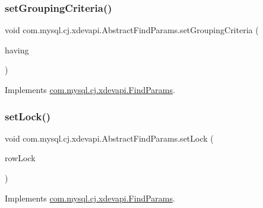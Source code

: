 \mbox{\label{classcom_1_1mysql_1_1cj_1_1xdevapi_1_1_abstract_find_params_a8e7b9f8acb811c6da58817a5d09e0444}} 
\subsubsection{\texorpdfstring{set\+Grouping\+Criteria()}{setGroupingCriteria()}}
{\footnotesize\ttfamily void com.\+mysql.\+cj.\+xdevapi.\+Abstract\+Find\+Params.\+set\+Grouping\+Criteria (\begin{DoxyParamCaption}\item[{String}]{having }\end{DoxyParamCaption})}



Implements \mbox{\hyperlink{interfacecom_1_1mysql_1_1cj_1_1xdevapi_1_1_find_params_a5f520024fb2633d0ab42d573c7aeac03}{com.\+mysql.\+cj.\+xdevapi.\+Find\+Params}}.

\mbox{\label{classcom_1_1mysql_1_1cj_1_1xdevapi_1_1_abstract_find_params_a5363ab2b37ba6e1f800ea99bbbb4503f}} 
\subsubsection{\texorpdfstring{set\+Lock()}{setLock()}}
{\footnotesize\ttfamily void com.\+mysql.\+cj.\+xdevapi.\+Abstract\+Find\+Params.\+set\+Lock (\begin{DoxyParamCaption}\item[{\mbox{\hyperlink{enumcom_1_1mysql_1_1cj_1_1xdevapi_1_1_find_params_1_1_row_lock}{Row\+Lock}}}]{row\+Lock }\end{DoxyParamCaption})}



Implements \mbox{\hyperlink{interfacecom_1_1mysql_1_1cj_1_1xdevapi_1_1_find_params_a7fe3613c0ce317de5b1ae07772d88844}{com.\+mysql.\+cj.\+xdevapi.\+Find\+Params}}.

